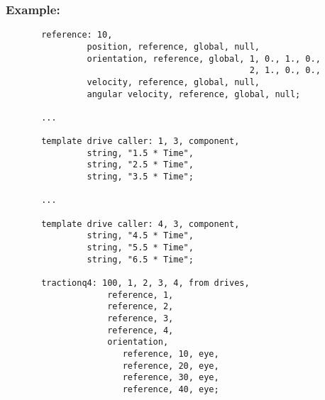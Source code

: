 \subsubsection{Example:}
\begin{verbatim}
       reference: 10, 
                position, reference, global, null,
                orientation, reference, global, 1, 0., 1., 0.,
                                                2, 1., 0., 0.,
                velocity, reference, global, null,
                angular velocity, reference, global, null;

       ...

       template drive caller: 1, 3, component, 
                string, "1.5 * Time", 
                string, "2.5 * Time",
                string, "3.5 * Time";

       ...

       template drive caller: 4, 3, component, 
                string, "4.5 * Time", 
                string, "5.5 * Time",
                string, "6.5 * Time";

       tractionq4: 100, 1, 2, 3, 4, from drives, 
                    reference, 1, 
                    reference, 2, 
                    reference, 3, 
                    reference, 4,
                    orientation, 
                       reference, 10, eye,
                       reference, 20, eye,
                       reference, 30, eye,
                       reference, 40, eye;
\end{verbatim}
